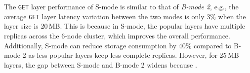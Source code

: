 %
%
The \texttt{GET} layer performance of S-mode is similar to that of \emph{B-mode 2}, e.g.,
the average \texttt{GET} layer latency variation between the two modes is only
3\% when the layer size is 20\,MB.
%
This is because in S-mode, the popular layers have multiple replicas
across the 6-node cluster, which improves the overall performance.
%
Additionally, S-mode can reduce storage consumption by 40\% compared to
B-mode 2 as less popular layers keep less complete replicas.
%
However, for 25\,MB layers, the gap between S-mode and B-mode 2 widens
because .


